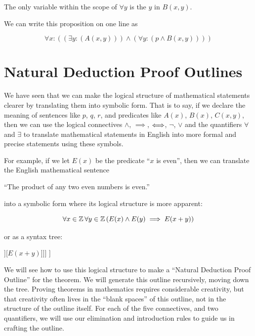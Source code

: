 \begin{solutions}
	The only variable within the scope of $\forall y$ is the $y$ in $B(x,y)$.
	
	We can write this proposition on one line as
	
	\[
	\forall x: (  (\exists y: ( A(x,y)))  \wedge (\forall y: ( p \wedge  B(x,y)))  )
	\]
	
\end{solutions}

\section{Natural Deduction Proof Outlines}

We have seen that we can make the logical structure of mathematical statements clearer by translating them into symbolic form.  That is to say, if we declare the meaning of sentences like $p$, $q$, $r$,  and predicates like $A(x)$,  $B(x)$,  $C(x,y)$, then we can use the logical connectives $\wedge$, $\implies$, $\Longleftrightarrow$, $\neg$, $\vee$ and the quantifiers $\forall$ and $\exists$ to translate mathematical statements in English into more formal and precise statements using these symbols.

For example, if we let $E(x)$ be the predicate ``$x$ is even'', then we can translate the English mathematical sentence 

{ \begin{center}
		``The product of any two even numbers is even.''
		\end{center}
}

into a symbolic form where its logical structure is more apparent:

$$
\forall x \in \mathbb{Z} \, \forall y \in \mathbb{Z} \left( E(x) \wedge E(y) \implies E(x+y) \right)
$$

or as a syntax tree:

\begin{center}
\begin{forest}
	[$\forall x \in \Z$[$\forall y \in \Z$[$\implies$[$\wedge$[$E(x)$][$E(y)$]][$E(x+y)$]]]
]
\end{forest}
\end{center}

We will see how to use this logical structure to make a ``Natural Deduction Proof Outline''  for the theorem.  We will generate this outline recursively, moving down the tree.  Proving theorems in mathematics requires considerable creativity, but that creativity often lives in the ``blank spaces'' of this outline, not in the structure of the outline itself.  For each of the five connectives, and two quantifiers, we will use our elimination and introduction rules to guide us in crafting the outline.

